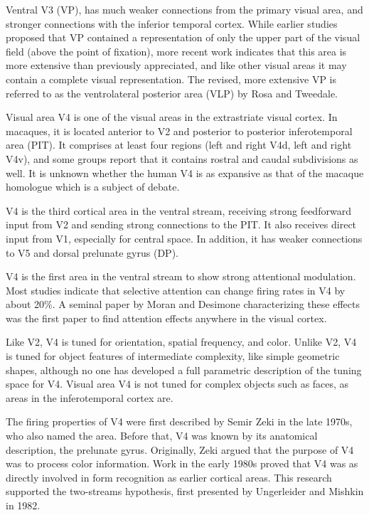\documentclass[]{book}
\begin{document}
Ventral V3 (VP), has much weaker connections from the primary visual area, and stronger connections with the inferior temporal cortex. While earlier studies proposed that VP contained a representation of only the upper part of the visual field (above the point of fixation), more recent work indicates that this area is more extensive than previously appreciated, and like other visual areas it may contain a complete visual representation. The revised, more extensive VP is referred to as the ventrolateral posterior area (VLP) by Rosa and Tweedale.

Visual area V4 is one of the visual areas in the extrastriate visual cortex. In macaques, it is located anterior to V2 and posterior to posterior inferotemporal area (PIT). It comprises at least four regions (left and right V4d, left and right V4v), and some groups report that it contains rostral and caudal subdivisions as well. It is unknown whether the human V4 is as expansive as that of the macaque homologue which is a subject of debate.

V4 is the third cortical area in the ventral stream, receiving strong feedforward input from V2 and sending strong connections to the PIT. It also receives direct input from V1, especially for central space. In addition, it has weaker connections to V5 and dorsal prelunate gyrus (DP).

V4 is the first area in the ventral stream to show strong attentional modulation. Most studies indicate that selective attention can change firing rates in V4 by about 20\%. A seminal paper by Moran and Desimone characterizing these effects was the first paper to find attention effects anywhere in the visual cortex.

Like V2, V4 is tuned for orientation, spatial frequency, and color. Unlike V2, V4 is tuned for object features of intermediate complexity, like simple geometric shapes, although no one has developed a full parametric description of the tuning space for V4. Visual area V4 is not tuned for complex objects such as faces, as areas in the inferotemporal cortex are.

The firing properties of V4 were first described by Semir Zeki in the late 1970s, who also named the area. Before that, V4 was known by its anatomical description, the prelunate gyrus. Originally, Zeki argued that the purpose of V4 was to process color information. Work in the early 1980s proved that V4 was as directly involved in form recognition as earlier cortical areas. This research supported the two-streams hypothesis, first presented by Ungerleider and Mishkin in 1982.
\end{document}
